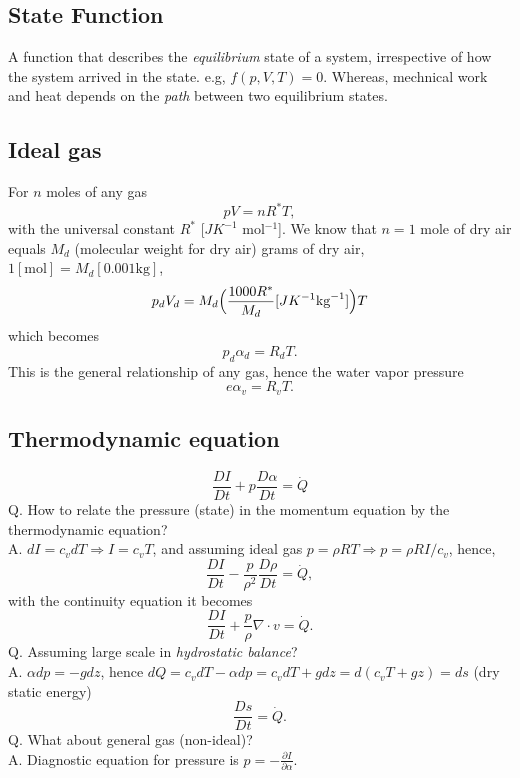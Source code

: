
\subsection{State Function}
A function that describes the \emph{equilibrium} state of a system, irrespective of how the system
arrived in the state. e.g, $f(p,V,T)=0$. Whereas, mechnical work and heat depends on the \emph{path}
between two equilibrium states. \\

\subsection{Ideal gas}
For $n$ moles of any gas
\begin{equation}
    pV = nR^*T,
\end{equation}
with the universal constant $R^*$ [$J K^{-1}$ mol$^{-1}$]. We know that $n=1$ mole of dry air equals
$M_d$ (molecular weight for dry air) grams of dry air, $1[\text{mol}] = M_d [0.001\text{kg}]$,
\begin{equation}
        p_d V_d  = M_d \Big(\frac{1000 R^*}{M_d} [ J K^{-1} \text{kg}^{-1}]\Big) T \\
\end{equation}
which becomes
\begin{equation} \label{eq:idealgas2}
    p_d \alpha_d = R_d T.
\end{equation}
This is the general relationship of any gas, hence the water vapor pressure 
\begin{equation} \label{eq:idealgas3}
   e \alpha_v = R_v T.
\end{equation}

\subsection{Thermodynamic equation}
\begin{equation}
    \frac{DI}{Dt} + p \frac{D\alpha}{Dt} = \dot{Q}
\end{equation}
Q. How to relate the pressure (state) in the momentum equation by the thermodynamic equation? \\
A. $dI = c_v dT \Rightarrow I = c_v T$, and assuming ideal gas $p = \rho R T \Rightarrow p = \rho R
I / c_v$,
hence,
\begin{equation}
    \frac{DI}{Dt} - \frac{p}{\rho^2} \frac{D\rho}{Dt} = \dot{Q},
\end{equation}
with the continuity equation it becomes
\begin{equation}
    \frac{DI}{Dt} + \frac{p}{\rho} \nabla \cdot v = \dot{Q}.
\end{equation}
Q. Assuming large scale in \emph{hydrostatic balance}? \\
A. $\alpha d p = -gdz$, hence $dQ = c_v dT - \alpha dp = c_v dT + gdz = d(c_v T + gz) = ds$ (dry
static energy)
\begin{equation}
    \frac{Ds}{Dt} = \dot{Q}.
\end{equation}
Q. What about general gas (non-ideal)? \\
A. Diagnostic equation for pressure is $p = -\frac{\partial I}{\partial \alpha}$. \\

